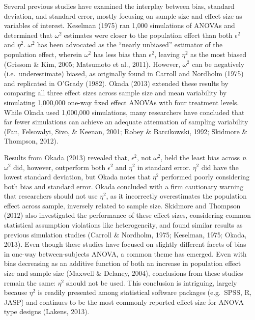 \documentclass[english,man]{apa6}
\theoremstyle{definition}
\theoremstyle{definition}
\theoremstyle{definition}
\theoremstyle{remark}
\begin{document}
Several previous studies have examined the interplay between bias,
standard deviation, and standard error, mostly focusing on sample size
and effect size as variables of interest. Keselman (1975) ran 1,000
simulations of ANOVAs and determined that \(\omega^2\) estimates were
closer to the population effect than both \(\epsilon^2\) and \(\eta^2\).
\(\omega^2\) has been advocated as the \enquote{nearly unbiased}
estimator of the population effect, wherein \(\omega^2\) has less bias
than \(\epsilon^2\), leaving \(\eta^2\) as the most biased (Grissom \&
Kim, 2005; Matsumoto et al., 2011). However, \(\omega^2\) can be
negatively (i.e.~underestimate) biased, as originally found in Carroll
and Nordholm (1975) and replicated in O'Grady (1982). Okada (2013)
extended these results by comparing all three effect sizes across sample
size and mean variability by simulating 1,000,000 one-way fixed effect
ANOVAs with four treatment levels. While Okada used 1,000,000
simulations, many researchers have concluded that far fewer simulations
can achieve an adequate attenuation of sampling variability (Fan,
Felsovalyi, Sivo, \& Keenan, 2001; Robey \& Barcikowski, 1992; Skidmore
\& Thompson, 2012).

Results from Okada (2013) revealed that, \(\epsilon^2\), not
\(\omega^2\), held the least bias across \emph{n}. \(\omega^2\) did,
however, outperform both \(\epsilon^2\) and \(\eta^2\) in standard
error. \(\eta^2\) did have the lowest standard deviation, but Okada
notes that \(\eta^2\) performed poorly considering both bias and
standard error. Okada concluded with a firm cautionary warning that
researchers should not use \(\eta^2\), as it incorrectly overestimates
the population effect across sample, inversely related to sample size.
Skidmore and Thompson (2012) also investigated the performance of these
effect sizes, considering common statistical assumption violations like
heterogeneity, and found similar results as previous simulation studies
(Carroll \& Nordholm, 1975; Keselman, 1975; Okada, 2013). Even though
these studies have focused on slightly different facets of bias in
one-way between-subjects ANOVA, a common theme has emerged. Even with
bias decreasing as an additive function of both an increase in
population effect size and sample size (Maxwell \& Delaney, 2004),
conclusions from these studies remain the same: \(\eta^2\) should not be
used. This conclusion is intriguing, largely because \(\eta^2\) is
readily presented among statistical software packages (e.g.~SPSS, R,
JASP) and continues to be the most commonly reported effect size for
ANOVA type designs (Lakens, 2013).
\end{document}
